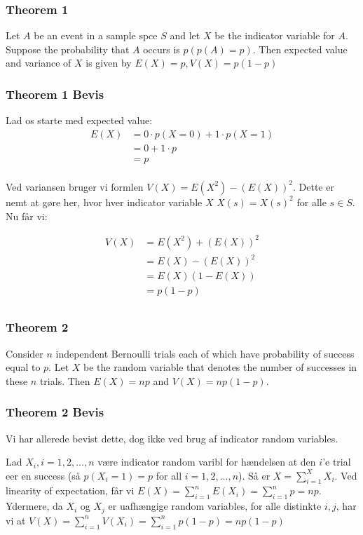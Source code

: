 \documentclass{beamer}
\begin{document}
\begin{frame}
  \frametitle{Theorem 1}
 \begin{theorem}
Let $A$ be an event in a sample spce $S$ and let $X$ be the indicator variable for $A$. Suppose the probability that $A$ occurs is $p (p(A) = p)$. Then expected value and variance of $X$ is given by $E(X) = p, V(X) = p(1-p)$
 \end{theorem} 
\end{frame}

\begin{frame}[allowframebreaks]
  \frametitle{Theorem 1 Bevis}
  Lad os starte med expected value:
  \begin{equation}
    \begin{split}
      E(X) &= 0 \cdot p(X=0) + 1 \cdot p(X=1) \\
           &= 0 + 1 \cdot p \\
           &= p \\
    \end{split}
  \end{equation}

  Ved variansen bruger vi formlen $V(X) = E(X^{2}) - (E(X))^{2}$. Dette er nemt at gøre her, hvor hver indicator variable $X$ $X(s) = X(s)^{2}$ for alle $s \in S$. Nu får vi:

  \begin{equation}
    \begin{split}
      V(X) &= E(X^{2}) + (E(X))^{2}\\
           &= E(X) - (E(X))^{2}\\
           &= E(X)(1- E(X))\\
           &= p(1-p)\\
    \end{split}
  \end{equation}
\end{frame}

\begin{frame}
  \frametitle{Theorem 2}
  
  \begin{theorem}
Consider $n$ independent Bernoulli trials each of which have probability of success equal to $p$. Let $X$ be the random variable that denotes the number of successes in these $n$ trials. Then $E(X) = np$ and $V(X) = np(1-p)$.
  \end{theorem}
\end{frame}

\begin{frame}
  \frametitle{Theorem 2 Bevis}
  Vi har allerede bevist dette, dog ikke ved brug af indicator random variables.

  Lad $X_{i}, i = 1, 2, \ldots, n$ være indicator random varibl for hændelsen at den $i$'e trial eer en success (så $p(X_{i} =1) = p$  for all $i = 1, 2, \ldots, n$). Så er $X = \sum_{i=1}^{{X}}X_{i}$. Ved linearity of expectation, får vi $E(X) = \sum_{i=1}^{n}E(X_{i}) = \sum_{i=1}^{n}p = np$. Ydermere, da $X_{i}$ og $X_{j}$ er uafhængige random variables, for alle distinkte $i,j$, har vi at $V(X) = \sum_{i=1}^{n} V(X_{i}) = \sum_{i=1}^{n}p(1-p)=np(1-p)$
\end{frame}
\end{document}
